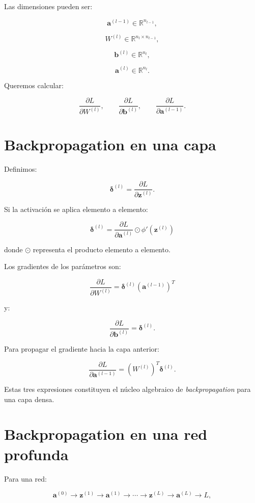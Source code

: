 \documentclass[
  letterpaper,
  DIV=11,
  numbers=noendperiod]{scrartcl}
\begin{document}
Las dimensiones pueden ser:

\[
\mathbf a^{(l-1)}\in\mathbb R^{n_{l-1}},
\]

\[
W^{(l)}
\in
\mathbb R^{n_l\times n_{l-1}},
\]

\[
\mathbf b^{(l)}
\in
\mathbb R^{n_l},
\]

\[
\mathbf a^{(l)}
\in
\mathbb R^{n_l}.
\]

Queremos calcular:

\[
\frac{\partial L}{\partial W^{(l)}},
\qquad
\frac{\partial L}{\partial\mathbf b^{(l)}},
\qquad
\frac{\partial L}{\partial\mathbf a^{(l-1)}}.
\]

\section{Backpropagation en una capa}\label{backpropagation-en-una-capa}

Definimos:

\[
\boldsymbol\delta^{(l)}
=
\frac{\partial L}{\partial\mathbf z^{(l)}}.
\]

Si la activación se aplica elemento a elemento:

\[
\boxed{
\boldsymbol\delta^{(l)}
=
\frac{\partial L}{\partial\mathbf a^{(l)}}
\odot
\phi'(\mathbf z^{(l)})
}
\]

donde \(\odot\) representa el producto elemento a elemento.

Los gradientes de los parámetros son:

\[
\boxed{
\frac{\partial L}{\partial W^{(l)}}
=
\boldsymbol\delta^{(l)}
(\mathbf a^{(l-1)})^T
}
\]

y:

\[
\boxed{
\frac{\partial L}{\partial\mathbf b^{(l)}}
=
\boldsymbol\delta^{(l)}.
}
\]

Para propagar el gradiente hacia la capa anterior:

\[
\boxed{
\frac{\partial L}{\partial\mathbf a^{(l-1)}}
=
(W^{(l)})^T
\boldsymbol\delta^{(l)}.
}
\]

Estas tres expresiones constituyen el núcleo algebraico de
\emph{backpropagation} para una capa densa.

\section{Backpropagation en una red
profunda}\label{backpropagation-en-una-red-profunda}

Para una red:

\[
\mathbf a^{(0)}
\rightarrow
\mathbf z^{(1)}
\rightarrow
\mathbf a^{(1)}
\rightarrow
\cdots
\rightarrow
\mathbf z^{(L)}
\rightarrow
\mathbf a^{(L)}
\rightarrow
L,
\]
\end{document}
